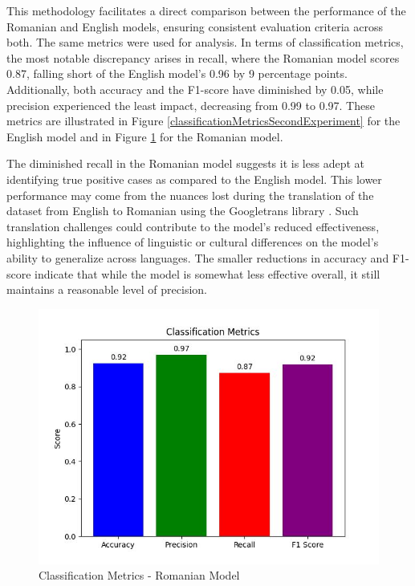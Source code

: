 This methodology facilitates a direct comparison between the performance of the Romanian and English models, ensuring consistent evaluation criteria across both. The same metrics were used for analysis. In terms of classification metrics, the most notable discrepancy arises in recall, where the Romanian model scores 0.87, falling short of the English model's 0.96 by 9 percentage points. Additionally, both accuracy and the F1-score have diminished by 0.05, while precision experienced the least impact, decreasing from 0.99 to 0.97. These metrics are illustrated in Figure \ref{classificationMetricsSecondExperiment} for the English model and in Figure \ref{classificationMetricsRomanianExperiment} for the Romanian model.

The diminished recall in the Romanian model suggests it is less adept at identifying true positive cases as compared to the English model. This lower performance may come from the nuances lost during the translation of the dataset from English to Romanian using the Googletrans library \cite{googletranslib}. Such translation challenges could contribute to the model’s reduced effectiveness, highlighting the influence of linguistic or cultural differences on the model’s ability to generalize across languages. The smaller reductions in accuracy and F1-score indicate that while the model is somewhat less effective overall, it still maintains a reasonable level of precision.

\begin{figure}[htbp]
	\centering
		\includegraphics[scale=0.8]{LaTeX Bachelor Thesis Depression Signs Detection/figures/metrics/experimentRomanian/classificationMetrics.jpg}
	\caption{Classification Metrics - Romanian Model}
	\label{classificationMetricsRomanianExperiment}
\end{figure}

